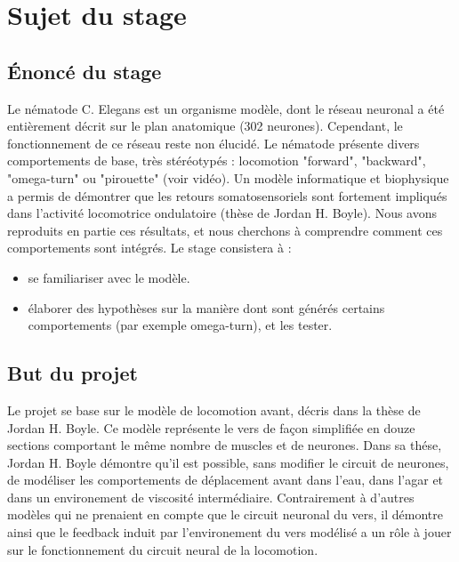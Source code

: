 \chapter{Sujet du stage} %
\label{cha:Sujet du stage}

\section{Énoncé du stage} %
\label{sec:Énoncé du stage}

Le nématode C. Elegans est un organisme modèle, dont le réseau neuronal a été entièrement décrit sur le plan
anatomique (302 neurones). Cependant, le fonctionnement de ce réseau reste non élucidé. Le nématode présente
divers comportements de base, très stéréotypés : locomotion "forward", "backward", "omega-turn" ou "pirouette"
(voir vidéo). Un modèle informatique et biophysique a permis de démontrer que les retours somatosensoriels
sont fortement impliqués dans l’activité locomotrice ondulatoire (thèse de Jordan H. Boyle). Nous avons
reproduits en partie ces résultats, et nous cherchons à comprendre comment ces comportements sont intégrés.
Le stage consistera à :
\begin{itemize}
   \item se familiariser avec le modèle.
   \item élaborer des hypothèses sur la manière dont sont générés certains comportements (par exemple
      omega-turn), et les tester.
\end{itemize}


\section{But du projet} %
\label{sec:But du projet}

Le projet se base sur le modèle de locomotion avant, décris dans la thèse de Jordan H. Boyle\cite{Boyle2009}.
Ce modèle représente le vers de façon simplifiée en douze sections comportant le même nombre de muscles et de neurones.
Dans sa thése, Jordan H. Boyle démontre qu'il est possible, sans modifier le circuit de neurones, de
modéliser les comportements de déplacement avant dans l'eau, dans l'agar et dans un environement
de viscosité intermédiaire. Contrairement à d'autres modèles qui ne prenaient en compte que le circuit neuronal
du vers, il démontre ainsi que le feedback induit par l'environement du vers modélisé a un rôle à jouer sur le
fonctionnement du circuit neural de la locomotion.

